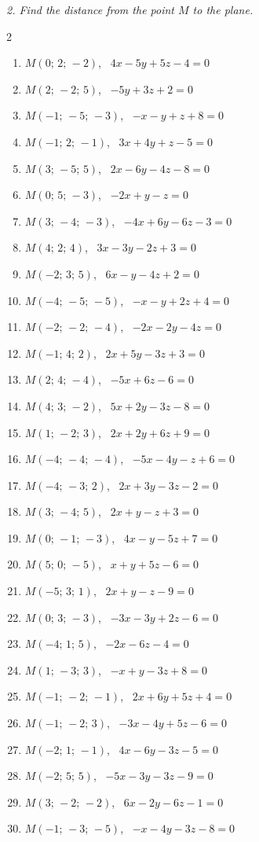 \emph{2. Find the distance from the point $M$ to the plane.}
\bigskip
\begin{multicols}{2}\raggedright
\begin{enumerate}[label=\arabic*., leftmargin=*]
\item $M(0;\,2;\,-2)$, \ $4x-5y+5z-4=0$
\item $M(2;\,-2;\,5)$, \ $-5y+3z+2=0$
\item $M(-1;\,-5;\,-3)$, \ $-x-y+z+8=0$
\item $M(-1;\,2;\,-1)$, \ $3x+4y+z-5=0$
\item $M(3;\,-5;\,5)$, \ $2x-6y-4z-8=0$
\item $M(0;\,5;\,-3)$, \ $-2x+y-z=0$
\item $M(3;\,-4;\,-3)$, \ $-4x+6y-6z-3=0$
\item $M(4;\,2;\,4)$, \ $3x-3y-2z+3=0$
\item $M(-2;\,3;\,5)$, \ $6x-y-4z+2=0$
\item $M(-4;\,-5;\,-5)$, \ $-x-y+2z+4=0$
\item $M(-2;\,-2;\,-4)$, \ $-2x-2y-4z=0$
\item $M(-1;\,4;\,2)$, \ $2x+5y-3z+3=0$
\item $M(2;\,4;\,-4)$, \ $-5x+6z-6=0$
\item $M(4;\,3;\,-2)$, \ $5x+2y-3z-8=0$
\item $M(1;\,-2;\,3)$, \ $2x+2y+6z+9=0$
\item $M(-4;\,-4;\,-4)$, \ $-5x-4y-z+6=0$
\item $M(-4;\,-3;\,2)$, \ $2x+3y-3z-2=0$
\item $M(3;\,-4;\,5)$, \ $2x+y-z+3=0$
\item $M(0;\,-1;\,-3)$, \ $4x-y-5z+7=0$
\item $M(5;\,0;\,-5)$, \ $x+y+5z-6=0$
\item $M(-5;\,3;\,1)$, \ $2x+y-z-9=0$
\item $M(0;\,3;\,-3)$, \ $-3x-3y+2z-6=0$
\item $M(-4;\,1;\,5)$, \ $-2x-6z-4=0$
\item $M(1;\,-3;\,3)$, \ $-x+y-3z+8=0$
\item $M(-1;\,-2;\,-1)$, \ $2x+6y+5z+4=0$
\item $M(-1;\,-2;\,3)$, \ $-3x-4y+5z-6=0$
\item $M(-2;\,1;\,-1)$, \ $4x-6y-3z-5=0$
\item $M(-2;\,5;\,5)$, \ $-5x-3y-3z-9=0$
\item $M(3;\,-2;\,-2)$, \ $6x-2y-6z-1=0$
\item $M(-1;\,-3;\,-5)$, \ $-x-4y-3z-8=0$
\end{enumerate}
\end{multicols}

